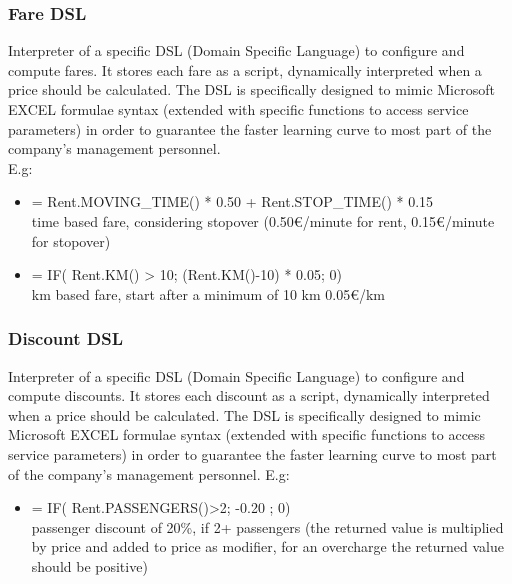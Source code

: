 \documentclass[english]{article}
\begin{document}
		\subsubsection{Fare DSL}
		Interpreter of a specific DSL (Domain Specific Language) to configure and compute fares. It stores each fare as a script,  dynamically interpreted when a price should be calculated. The DSL is specifically designed to mimic Microsoft EXCEL formulae syntax (extended with specific functions to access service parameters) in order to guarantee the faster learning curve to most part of the company's management personnel.\\
		E.g: 
		\begin{itemize}
			\item { = Rent.MOVING\_TIME() * 0.50 + Rent.STOP\_TIME() * 0.15     \\time based fare, considering stopover (0.50\euro/minute for rent, 0.15\euro/minute for stopover)}
			\item { = IF( Rent.KM() > 10; (Rent.KM()-10) * 0.05; 0) 			      \\ km based fare, start after a minimum of 10 km 0.05\euro/km}
		\end{itemize}
		\subsubsection{Discount DSL}
		Interpreter of a specific DSL (Domain Specific Language) to configure and compute discounts. It stores each discount as a script,  dynamically interpreted when a price should be calculated. The DSL is specifically designed to mimic Microsoft EXCEL formulae syntax (extended with specific functions to access service parameters) in order to guarantee the faster learning curve to most part of the company's management personnel.
		E.g: 
		\begin{itemize}
			\item { = IF( Rent.PASSENGERS()>2; -0.20 ; 0)     \\passenger discount of 20\%, if 2+ passengers (the returned value is multiplied by price and added to price as modifier, for an overcharge the returned value should be positive) }
		\end{itemize}
	
	
	
\end{document}
